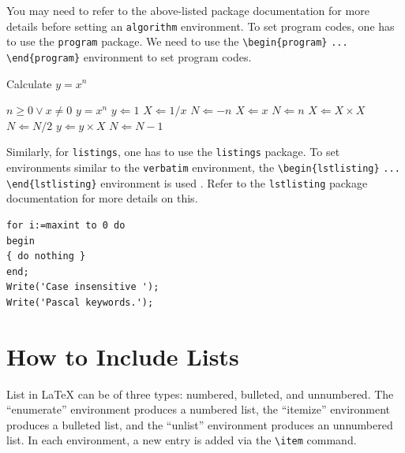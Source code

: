 \documentclass[12pt,a4paper]{article}
\begin{document}
You may need to refer to the above-listed package documentation for more details before setting an \verb+algorithm+ environment.
To set program codes, one has to use the \verb+program+ package. We need to use the \verb+\begin{program}+ \verb+...+
\verb+\end{program}+ environment to set program codes.

\begin{algorithm}[!ht]
\caption{Calculate $y = x^n$}\label{algo1}
\begin{algorithmic}[1]
\Require $n \geq 0 \vee x \neq 0$
\Ensure $y = x^n$
\State $y \Leftarrow 1$
        \State $X \Leftarrow 1 / x$
        \State $N \Leftarrow -n$
\Else
        \State $X \Leftarrow x$
        \State $N \Leftarrow n$
\EndIf
{}
            \State $X \Leftarrow X \times X$
            \State $N \Leftarrow N / 2$
        \Else[$N$ is odd]
            \State $y \Leftarrow y \times X$
            \State $N \Leftarrow N - 1$
        \EndIf
\EndWhile
\end{algorithmic}
\end{algorithm}

Similarly, for \verb+listings+, one has to use the \verb+listings+ package. To set environments similar to the \verb+verbatim+ environment, the \verb+\begin{lstlisting}+ \verb+... + \verb+\end{lstlisting}+ environment is used . Refer to the \verb+lstlisting+ package documentation for more details on this.

\begin{minipage}{\hsize}%
\lstset{language=Pascal}%
\begin{lstlisting}[frame=single,framexleftmargin=-1pt,framexrightmargin=-17pt,framesep=12pt,linewidth=0.95\textwidth]
for i:=maxint to 0 do
begin
{ do nothing }
end;
Write('Case insensitive ');
Write('Pascal keywords.');
\end{lstlisting}
\end{minipage}


\section{How to Include Lists}\label{sec7}

List in \LaTeX{} can be of three types: numbered, bulleted, and unnumbered. The ``enumerate'' environment produces a numbered list, the 
``itemize'' environment produces a bulleted list, and the ``unlist''
environment produces an unnumbered list.
In each environment, a new entry is added via the \verb+\item+ command.
\end{document}
